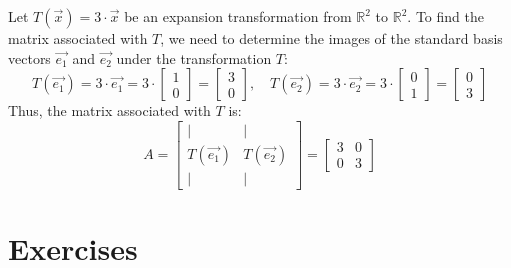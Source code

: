 \begin{eg}
    Let $T(\vec{x}) = 3 \cdot \vec{x}$ be an expansion transformation from $\mathbb{R}^2$ to $\mathbb{R}^2$. To find the matrix associated with $T$, we need to determine the images of the standard basis vectors $\vec{e_1}$ and $\vec{e_2}$ under the transformation $T$:
    \[
        T(\vec{e_1}) = 3 \cdot \vec{e_1} = 3 \cdot \begin{bmatrix} 1 \\ 0 \end{bmatrix} = \begin{bmatrix} 3 \\ 0 \end{bmatrix}, \quad T(\vec{e_2}) = 3 \cdot \vec{e_2} = 3 \cdot \begin{bmatrix} 0 \\ 1 \end{bmatrix} = \begin{bmatrix} 0 \\ 3 \end{bmatrix}
    \]
    Thus, the matrix associated with $T$ is:
    \[
        A = \begin{bmatrix} | & | \\ T(\vec{e_1}) & T(\vec{e_2}) \\ | & | \end{bmatrix} = \begin{bmatrix} 3 & 0 \\ 0 & 3 \end{bmatrix}
    \]
\end{eg}

\section{Exercises}
